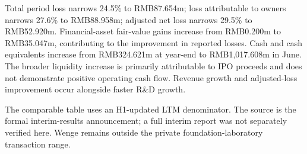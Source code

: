 \documentclass[11pt]{article}
\begin{document}
Total period loss narrows 24.5\% to RMB87.654m; loss attributable to owners narrows 27.6\% to RMB88.958m; adjusted net loss narrows 29.5\% to RMB52.920m. Financial-asset fair-value gains increase from RMB0.200m to RMB35.047m, contributing to the improvement in reported losses. Cash and cash equivalents increase from RMB324.621m at year-end to RMB1,017.608m in June. The broader liquidity increase is primarily attributable to IPO proceeds and does not demonstrate positive operating cash flow. Revenue growth and adjusted-loss improvement occur alongside faster R\&D growth.

The comparable table uses an H1-updated LTM denominator. The source is the formal interim-results announcement; a full interim report was not separately verified here. Wenge remains outside the private foundation-laboratory transaction range.
\end{document}
